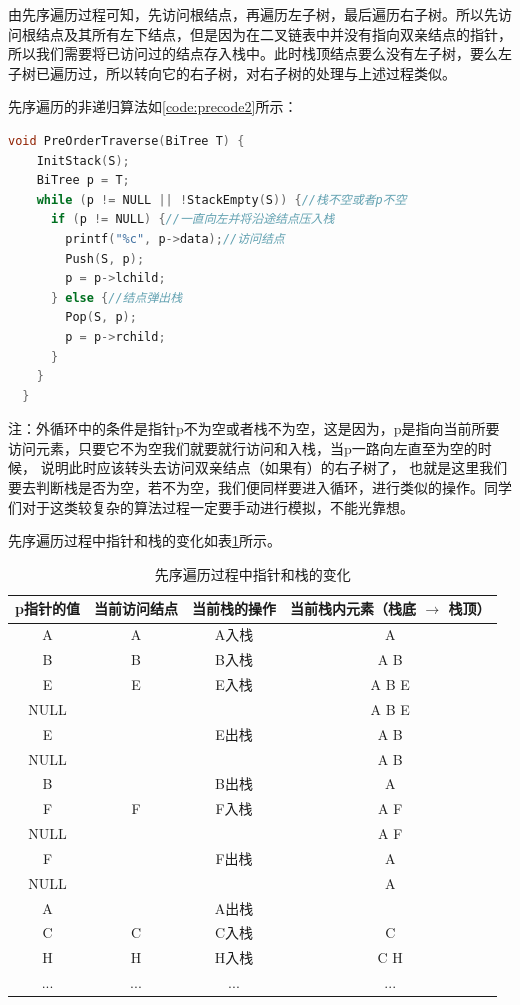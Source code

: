 \documentclass[lang=cn,newtx,10pt,scheme=chinese]{../elegantbook}
\begin{document}
由先序遍历过程可知，先访问根结点，再遍历左子树，最后遍历右子树。所以先访问根结点及其所有左下结点，但是因为在二叉链表中并没有指向双亲结点的指针，
所以我们需要将已访问过的结点存入栈中。此时栈顶结点要么没有左子树，要么左子树已遍历过，所以转向它的右子树，对右子树的处理与上述过程类似。

先序遍历的非递归算法如\ref{code:precode2}所示：

\begin{lstlisting}[language=C++, caption={先序遍历}, label={code:precode2}]
  void PreOrderTraverse(BiTree T) {
    InitStack(S);
    BiTree p = T;
    while (p != NULL || !StackEmpty(S)) {//栈不空或者p不空
      if (p != NULL) {//一直向左并将沿途结点压入栈
        printf("%c", p->data);//访问结点
        Push(S, p);
        p = p->lchild;
      } else {//结点弹出栈
        Pop(S, p);
        p = p->rchild;
      }
    }
  }
\end{lstlisting}

注：外循环中的条件是指针p不为空或者栈不为空，这是因为，p是指向当前所要访问元素，只要它不为空我们就要就行访问和入栈，当p一路向左直至为空的时候，
说明此时应该转头去访问双亲结点（如果有）的右子树了，
也就是这里我们要去判断栈是否为空，若不为空，我们便同样要进入循环，进行类似的操作。同学们对于这类较复杂的算法过程一定要手动进行模拟，不能光靠想。

先序遍历过程中指针和栈的变化如表\ref{tab:preorder_stack}所示。

\begin{table}[h!]
  \centering
  \caption{先序遍历过程中指针和栈的变化}
  \begin{tabular}{|c|c|c|c|}
  \hline
  \textbf{p指针的值} & \textbf{当前访问结点} & \textbf{当前栈的操作} & \textbf{当前栈内元素（栈底 $\to$ 栈顶）} \\ \hline
  A & A & A入栈 & A \\ \hline
  B & B & B入栈 & A B \\ \hline
  E & E & E入栈 & A B E \\ \hline
  NULL &  &  & A B E \\ \hline
  E &  & E出栈 & A B \\ \hline
  NULL &  &  & A B \\ \hline
  B &  & B出栈 & A \\ \hline
  F & F & F入栈 & A F \\ \hline
  NULL &  &  & A F \\ \hline
  F &  & F出栈 & A \\ \hline
  NULL &  &  & A \\ \hline
  A &  & A出栈 &  \\ \hline
  C & C & C入栈 & C \\ \hline
  H & H & H入栈 & C H \\ \hline
  ... & ... & ... & ... \\ \hline
  \end{tabular}
  \label{tab:preorder_stack}
  \end{table}
\end{document}
